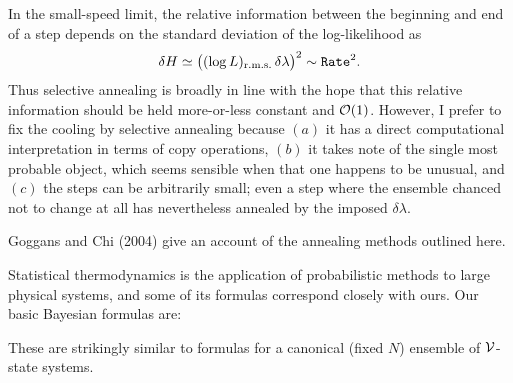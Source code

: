 In the small-speed limit, the relative information between the beginning and end of a step depends on the standard deviation of the log-likelihood as
$$
    \delta H \simeq \big((\log L)_{\rm r.m.s.}\, \delta\lambda \big)^2 \sim {\tt Rate}^2.
$$
Thus selective annealing is broadly in line with the hope that this relative information should be held more-or-less constant and ${\cal O}(1)$.
However, I prefer to fix the cooling by selective annealing because $(a)$ it has a direct computational interpretation in terms of copy operations, 
$(b)$ it takes note of the single most probable object, which seems sensible when that one happens to be unusual, and
$(c)$ the steps can be arbitrarily small; even a step where the ensemble chanced not to change at all has nevertheless annealed by the imposed $\delta\lambda$.

Goggans and Chi (2004) give an account of the annealing methods outlined here.

\bigskip
{}
\smallskip

Statistical thermodynamics is the application of probabilistic methods to large physical systems,
and some of its formulas correspond closely with ours.
Our basic Bayesian formulas are:

{\jot
{}
}\vskip 2pt
\noindent
These are strikingly similar to formulas for a canonical (fixed $N$) ensemble of $\cal V$-state systems.

